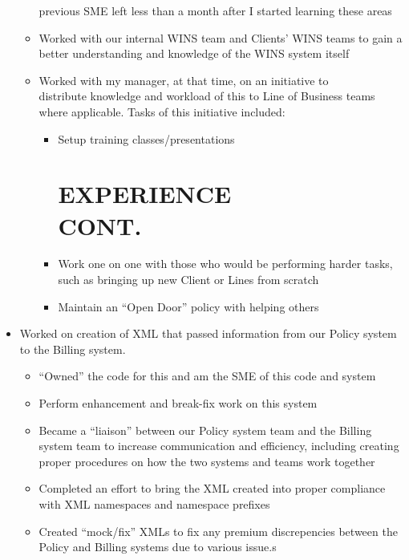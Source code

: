 \documentclass[margin]{res}
\begin{document}
\begin{resume}
\begin{itemize}
\begin{itemize}
               previous SME left less than a month after I started learning these areas
            \item Worked with our internal WINS team and Clients' WINS teams to gain a 
               better understanding and knowledge of the WINS system itself
            \item Worked with my manager, at that time, on an initiative to \\
            distribute 
               knowledge and workload of this to Line of Business teams where 
               applicable. 
               Tasks of this initiative included:
               \begin{itemize}
                  \item Setup training classes/presentations 
   \section{EXPERIENCE \\ CONT.}
                  \item Work one on one with those who would be performing harder tasks, 
                     such as bringing up new Client or Lines from scratch
                  \item Maintain an ``Open Door'' policy with helping others
               \end{itemize}
         \end{itemize}
      \item Worked on creation of XML that passed information from our Policy system 
         to the Billing system.
         \begin{itemize}
            \item ``Owned'' the code for this and am the SME of this code and 
               system
            \item Perform enhancement and break-fix work on this system
            \item Became a ``liaison'' between our Policy system team and the Billing 
               system team to increase communication and efficiency, including creating 
               proper procedures on how the two systems and teams work together
            \item Completed an effort to bring the XML created into proper 
               compliance with XML namespaces and namespace prefixes
            \item Created ``mock/fix'' XMLs to fix any premium discrepencies between the 
               Policy and Billing systems due to various issue.s

\end{itemize}
\end{itemize}
\end{resume}
\end{document}
